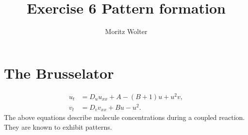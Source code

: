 




\title{Exercise 6 Pattern formation}
\author{Moritz Wolter}

\maketitle

\section{The Brusselator}
\begin{align}
u_t &= D_u u_{xx} + A - (B + 1)u + u^2 v, \\
v_t &= D_v v_{xx} + Bu - u^2 .
\end{align}
The above equations describe molecule concentrations during a coupled reaction. They are known to exhibit patterns.  

